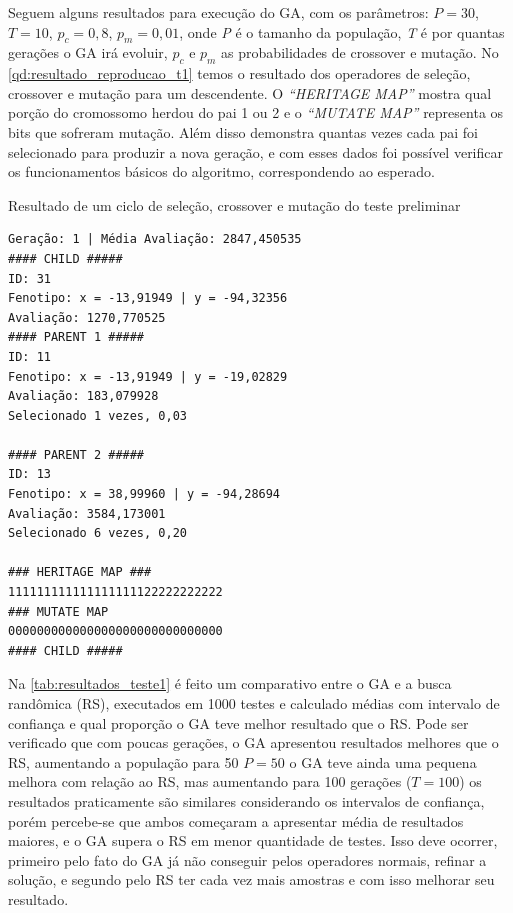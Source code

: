 Seguem alguns resultados para execução do GA, com os parâmetros: \(P = 30\), \(T = 10\), \(p_c = 0,8\), \(p_m = 0,01\), onde \textit{P} é o tamanho da população, \textit{T} é por quantas gerações o GA irá evoluir, \(p_c\) e \(p_m\) as probabilidades de crossover e mutação. No \autoref{qd:resultado_reproducao_t1} temos o resultado dos operadores de seleção, crossover e mutação para um descendente. O \textit{``HERITAGE MAP''} mostra qual porção do cromossomo herdou do pai 1 ou 2 e o \textit{``MUTATE MAP''} representa os bits que sofreram mutação. Além disso demonstra quantas vezes cada pai foi selecionado para produzir a nova geração, e com esses dados foi possível verificar os funcionamentos básicos do algoritmo, correspondendo ao esperado. %

\begin{quadro}
\caption{\label{qd:resultado_reproducao_t1}Resultado de um ciclo de seleção, crossover e mutação do teste preliminar}
\begin{verbatim}
Geração: 1 | Média Avaliação: 2847,450535
#### CHILD #####
ID: 31
Fenotipo: x = -13,91949 | y = -94,32356
Avaliação: 1270,770525
#### PARENT 1 #####
ID: 11
Fenotipo: x = -13,91949 | y = -19,02829
Avaliação: 183,079928
Selecionado 1 vezes, 0,03

#### PARENT 2 #####
ID: 13
Fenotipo: x = 38,99960 | y = -94,28694
Avaliação: 3584,173001
Selecionado 6 vezes, 0,20

### HERITAGE MAP ###
111111111111111111122222222222
### MUTATE MAP
000000000000000000000000000000
#### CHILD #####
\end{verbatim}
\end{quadro}

Na \autoref{tab:resultados_teste1} é feito um comparativo entre o GA e a busca randômica (RS), executados em 1000 testes e calculado médias com intervalo de confiança e qual proporção o GA teve melhor resultado que o RS. Pode ser verificado que com poucas gerações, o GA apresentou resultados melhores que o RS, aumentando a população para 50 \(P=50\) o GA teve ainda uma pequena melhora com relação ao RS, mas aumentando para 100 gerações (\(T=100\)) os resultados praticamente são similares considerando os intervalos de confiança, porém percebe-se que ambos começaram a apresentar média de resultados maiores, e o GA supera o RS em menor quantidade de testes. Isso deve ocorrer, primeiro pelo fato do GA já não conseguir pelos operadores normais, refinar a solução, e segundo pelo RS ter cada vez mais amostras e com isso melhorar seu resultado.

